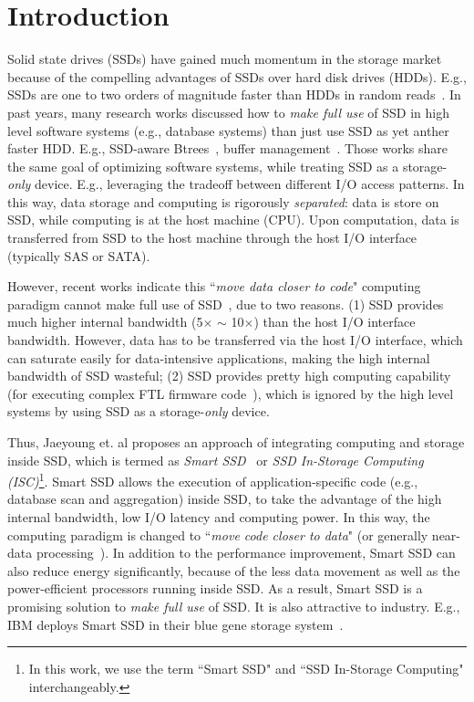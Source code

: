 
\section{Introduction}
Solid state drives (SSDs) have gained much momentum in the storage market because of the compelling advantages of SSDs over hard disk drives (HDDs). E.g., SSDs are one to two orders of magnitude faster than HDDs in random reads~\cite{AthanassoulisACGS10}. In past years, many research works discussed how to \emph{make full use} of SSD in high level software systems (e.g., database systems) than just use SSD as yet anther faster HDD.
E.g., SSD-aware Btrees~\cite{Li2010TIS}, buffer management~\cite{Do2011TDB}. Those works share the same goal of optimizing software systems, while treating SSD as a storage-\emph{only} device. E.g., leveraging the tradeoff between different I/O access patterns. In this way, data storage and computing is rigorously \emph{separated}: data is store on SSD, while computing is at the host machine (CPU). Upon computation, data is transferred from SSD to the host machine through the host I/O interface (typically SAS or SATA).

However, recent works indicate this ``\emph{move data closer to code}" computing paradigm cannot make full use of SSD~\cite{Do2013QPS,WoodsIA14}, due to two reasons. (1) SSD provides much higher internal bandwidth (5$\times$ $\sim$ 10$\times$) than the host I/O interface bandwidth. However, data has to be transferred via the host I/O interface, which can saturate easily for data-intensive applications, making the high internal bandwidth of SSD wasteful; (2) SSD provides pretty high computing capability (for executing complex FTL firmware code~\cite{Chung2009SFT}), which is ignored by the high level systems by using SSD as a storage-\emph{only} device.

Thus, Jaeyoung et. al proposes an approach of integrating computing and storage inside SSD, which is termed as \emph{Smart SSD}~\cite{Do2013QPS} or \emph{SSD In-Storage Computing (ISC)}\footnote{In this work, we use the term ``Smart SSD" and ``SSD In-Storage Computing" interchangeably.}. Smart SSD allows the execution of application-specific code (e.g., database scan and aggregation) inside SSD, to take the advantage of the high internal bandwidth, low I/O latency and computing power. In this way, the computing paradigm is changed to ``\emph{move code closer to data}" (or generally near-data processing~\cite{Balasubramonian14}). In addition to the performance improvement, Smart SSD can also reduce energy significantly, because of the less data movement as well as the power-efficient processors running inside SSD. As a result, Smart SSD is a promising solution to \emph{make full use} of SSD. It is also attractive to industry. E.g., IBM deploys Smart SSD in their blue gene storage system~\cite{Julich13}.

